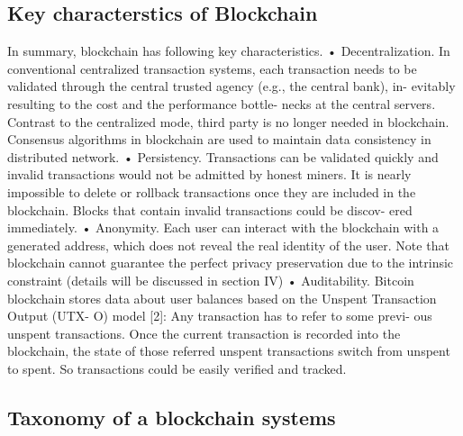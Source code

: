 \documentclass[conference]{IEEEtran}
\begin{document}
\subsection{Key characterstics of Blockchain}
In summary, blockchain has following key characteristics.
• Decentralization. In conventional centralized transaction
systems, each transaction needs to be validated through
the central trusted agency (e.g., the central bank), in-
evitably resulting to the cost and the performance bottle-
necks at the central servers. Contrast to the centralized
mode, third party is no longer needed in blockchain.
Consensus algorithms in blockchain are used to maintain
data consistency in distributed network.
• Persistency. Transactions can be validated quickly and
invalid transactions would not be admitted by honest
miners. It is nearly impossible to delete or rollback
transactions once they are included in the blockchain.
Blocks that contain invalid transactions could be discov-
ered immediately.
• Anonymity. Each user can interact with the blockchain
with a generated address, which does not reveal the
real identity of the user. Note that blockchain cannot
guarantee the perfect privacy preservation due to the
intrinsic constraint (details will be discussed in section
IV)
• Auditability. Bitcoin blockchain stores data about user
balances based on the Unspent Transaction Output (UTX-
O) model [2]: Any transaction has to refer to some previ-
ous unspent transactions. Once the current transaction is
recorded into the blockchain, the state of those referred
unspent transactions switch from unspent to spent. So
transactions could be easily verified and tracked.

\subsection{Taxonomy of a blockchain systems}
\end{document}
